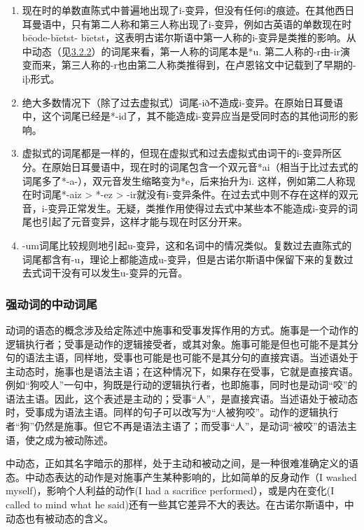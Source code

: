 \begin{enumerate}
\def\labelenumi{\arabic{enumi})}
\item
  现在时的单数直陈式中普遍地出现了i-变异，但没有任何i的痕迹。在其他西日耳曼语中，只有第二人称和第三人称出现了i-变异，例如古英语的单数现在时bēode-bīetst-
  bīetst，这表明古诺尔斯语中第一人称的i-变异是类推的影响。从中动态（见\hyperref[ux5f3aux52a8ux8bcdux7684ux4e2dux52a8ux8bcdux5c3e]{3.2.2}）的词尾来看，第一人称的词尾本是*u.
  第二人称的-r由-ir演变而来，第三人称的-r也由第二人称类推得到，在卢恩铭文中记载到了早期的-iþ形式。
\item
  绝大多数情况下（除了过去虚拟式）词尾-ið不造成i-变异。在原始日耳曼语中，这个词尾已经是*-id了，其不能造成i-变异应当是受同时态的其他词形的影响。
\item
  \label{_Ref116919964}{}虚拟式的词尾都是一样的，但现在虚拟式和过去虚拟式由词干的i-变异所区分。在原始日耳曼语中，现在时的词尾包含一个双元音*ai（相当于比过去式的词尾多了*-a-），双元音发生缩略变为*e，后来抬升为i.
  这样，例如第二人称现在时词尾*-aiz \textgreater{} *-ez \textgreater{}
  -ir就没有i-变异条件。在过去式中则不存在这样的双元音，i-变异正常发生。无疑，类推作用使得过去式中某些本不能造成i-变异的词尾也引起了元音变异，这样才能与现在时区分开来。
\item
  -um词尾比较规则地引起u-变异，这和名词中的情况类似。复数过去直陈式的词尾都含有-u，理论上都能造成u-变异，但是古诺尔斯语中保留下来的复数过去式词干没有可以发生u-变异的元音。
\end{enumerate}

\subsubsection{强动词的中动词尾}\label{ux5f3aux52a8ux8bcdux7684ux4e2dux52a8ux8bcdux5c3e}

动词的语态的概念涉及给定陈述中施事和受事发挥作用的方式。施事是一个动作的逻辑执行者；受事是动作的逻辑接受者，或其对象。施事可能是但也可能不是其分句的语法主语，同样地，受事也可能是也可能不是其分句的直接宾语。当述语处于主动态时，施事也是语法主语；在这种情况下，如果存在受事，它就是直接宾语。例如``狗咬人''一句中，狗既是行动的逻辑执行者，也即施事，同时也是动词``咬''的语法主语。因此，这个表述是主动的；受事``人''，是直接宾语。当述语处于被动态时，受事成为语法主语。同样的句子可以改写为``人被狗咬''。动作的逻辑执行者``狗''仍然是施事。但它不再是语法主语了；而受事``人''，是动词``被咬''的语法主语，使之成为被动陈述。

中动态，正如其名字暗示的那样，处于主动和被动之间，是一种很难准确定义的语态。中动态表达的动作是对施事产生某种影响的，比如简单的反身动作（I
washed myself‌)，影响个人利益的动作(I had a sacrifice
performed），或是内在变化(I called to mind what he
said)还有一些其它差异不大的表达。在古诺尔斯语中，中动态也有被动态的含义。

